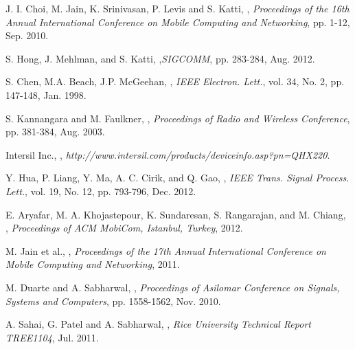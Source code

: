 \documentclass[twocolumn]{IEEEtran}
\begin{document}
\begin{thebibliography}{1}
J. I. Choi, M. Jain, K. Srinivasan, P. Levis and S. Katti,
,
\newblock \textit{Proceedings of the 16th Annual International Conference on Mobile Computing and Networking}, pp. 1-12,
Sep. 2010.

S. Hong, J. Mehlman, and S. Katti, ,\newblock \textit{SIGCOMM}, pp. 283-284,
Aug. 2012.


S. Chen, M.A. Beach, J.P. McGeehan,
,
\newblock \textit{IEEE Electron. Lett.}, vol. 34, No. 2, pp.
147-148, Jan. 1998.

S. Kannangara and M. Faulkner, ,
\newblock \textit{Proceedings of Radio and Wireless Conference}, pp. 381-384, Aug. 2003.


Intersil Inc., ,
\newblock \textit{http://www.intersil.com/products/deviceinfo.asp?pn=QHX220}.


Y. Hua, P. Liang, Y. Ma, A. C. Cirik, and Q. Gao,
,
\newblock \textit{IEEE Trans. Signal Process. Lett.}, vol. 19, No. 12, pp.
793-796, Dec. 2012.

E. Aryafar, M. A. Khojastepour, K. Sundaresan, S. Rangarajan, and M.
Chiang,
,
\newblock \textit{Proceedings of ACM MobiCom, Istanbul, Turkey}, 2012.


M. Jain et al., ,
\newblock \textit{Proceedings of the 17th Annual International Conference on Mobile Computing and Networking}, 2011.


M. Duarte and A. Sabharwal, ,
\newblock \textit{Proceedings of Asilomar Conference on Signals, Systems and Computers}, pp. 1558-1562,
Nov. 2010.

A. Sahai, G. Patel and A. Sabharwal,
,
\newblock \textit{Rice University Technical Report TREE1104}, Jul. 2011.


\end{thebibliography}
\end{document}
